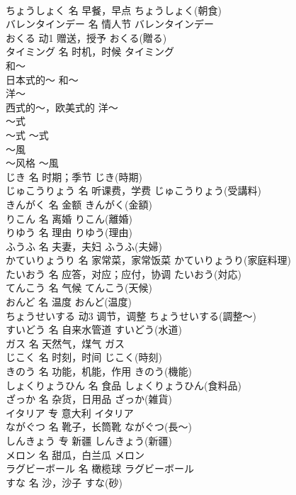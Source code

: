 \documentclass[8pt]{extreport}
\begin{document}
\begin{CJK}{UTF8}{min}
\\	ちょうしょく	名	早餐，早点	ちょうしょく(朝食)	
\\	バレンタインデー	名	情人节	バレンタインデー	
\\	おくる	动1	赠送，授予	おくる(贈る)	
\\	タイミング	名	时机，时候	タイミング	
\\	和～	
\\	日本式的～	和～	
\\	洋～	
\\	西式的～，欧美式的	洋～	
\\	～式	
\\	～式	～式	
\\	～風	
\\	～风格	～風	
\\	じき	名	时期；季节	じき(時期)	
\\	じゅこうりょう	名	听课费，学费	じゅこうりょう(受講料)	
\\	きんがく	名	金额	きんがく(金額)	
\\	りこん	名	离婚	りこん(離婚)	
\\	りゆう	名	理由	りゆう(理由)	
\\	ふうふ	名	夫妻，夫妇	ふうふ(夫婦)	
\\	かていりょうり	名	家常菜，家常饭菜	かていりょうり(家庭料理)	
\\	たいおう	名	应答，对应；应付，协调	たいおう(対応)	
\\	てんこう	名	气候	てんこう(天候)	
\\	おんど	名	温度	おんど(温度)	
\\	ちょうせいする	动3	调节，调整	ちょうせいする(調整～)	
\\	すいどう	名	自来水管道	すいどう(水道)	
\\	ガス	名	天然气，煤气	ガス	
\\	じこく	名	时刻，时间	じこく(時刻)	
\\	きのう	名	功能，机能，作用	きのう(機能)	
\\	しょくりょうひん	名	食品	しょくりょうひん(食料品)	
\\	ざっか	名	杂货，日用品	ざっか(雑貨)	
\\	イタリア	专	意大利	イタリア	
\\	ながぐつ	名	靴子，长筒靴	ながぐつ(長～)	
\\	しんきょう	专	新疆	しんきょう(新疆)	
\\	メロン	名	甜瓜，白兰瓜	メロン	
\\	ラグビーボール	名	橄榄球	ラグビーボール	
\\	すな	名	沙，沙子	すな(砂)	

\end{CJK}
\end{document}
